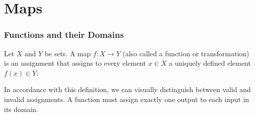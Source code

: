 \setcounter{chapter}{3}
\renewcommand{\thetheorem}{\thechapter.\arabic{theorem}}
\setcounter{theorem}{0}

\chapter{Maps}

\subsection{Functions and their Domains}

\begin{definition}
Let $X$ and $Y$ be sets. A map $f: X \to Y$ (also called a function or transformation) is an assignment that assigns to every element $x \in X$ a uniquely defined element $f(x) \in Y$. 
\end{definition}

In accordance with this definition, we can visually distinguish between valid and invalid assignments. A function must assign exactly one output to each input in its domain.

